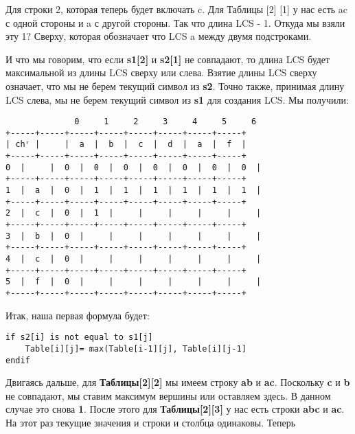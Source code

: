 \vspace{\baselineskip}
Для строки 2, которая теперь будет включать c. Для Таблицы [2] [1] у нас есть
ac с одной стороны и a с другой стороны. Так что длина LCS - 1. Откуда мы
взяли эту 1? Сверху, которая обозначает что LCS a между двумя подстроками.

И что мы говорим, что если \textbf{s1[2]} и \textbf{s2[1]} не совпадают, то длина LCS будет
максимальной из длины LCS сверху или слева. Взятие длины LCS сверху означает, что мы не берем
текущий символ из \textbf{s2}. Точно также, принимая длину LCS слева, мы не берем
текущий символ из \textbf{s1} для создания LCS. Мы получили:
\vspace{\baselineskip}
\begin{tcolorbox}
\begin{verbatim}
              0     1     2     3     4     5     6
+-----+-----+-----+-----+-----+-----+-----+-----+
| chʳ |     |  a  |  b  |  c  |  d  |  a  |  f  |
+-----+-----+-----+-----+-----+-----+-----+-----+
0  |     |  0  |  0  |  0  |  0  |  0  |  0  |  0  |
+-----+-----+-----+-----+-----+-----+-----+-----+
1  |  a  |  0  |  1  |  1  |  1  |  1  |  1  |  1  |
+-----+-----+-----+-----+-----+-----+-----+-----+
2  |  c  |  0  |  1  |     |     |     |     |     |
+-----+-----+-----+-----+-----+-----+-----+-----+
3  |  b  |  0  |     |     |     |     |     |     |
+-----+-----+-----+-----+-----+-----+-----+-----+
4  |  c  |  0  |     |     |     |     |     |     |
+-----+-----+-----+-----+-----+-----+-----+-----+
5  |  f  |  0  |     |     |     |     |     |     |
+-----+-----+-----+-----+-----+-----+-----+-----+
\end{verbatim}
\end{tcolorbox}
\vspace{\baselineskip}
Итак, наша первая формула будет:
\vspace{\baselineskip}
\begin{tcolorbox}
\begin{verbatim}     
if s2[i] is not equal to s1[j]
    Table[i][j]= max(Table[i-1][j], Table[i][j-1]
endif
\end{verbatim}
\end{tcolorbox}
\vspace{\baselineskip}
Двигаясь дальше, для \textbf{Таблицы[2][2]} мы имеем строку \textbf{ab} и \textbf{ac}. Поскольку \textbf{c} и
\textbf{b} не совпадают, мы ставим максимум вершины или оставляем здесь. В
данном случае это снова \textbf{1}. После этого для \textbf{Таблицы[2][3]} у нас есть строки
\textbf{abc} и \textbf{ac}. На этот раз текущие значения и строки и столбца одинаковы. Теперь
